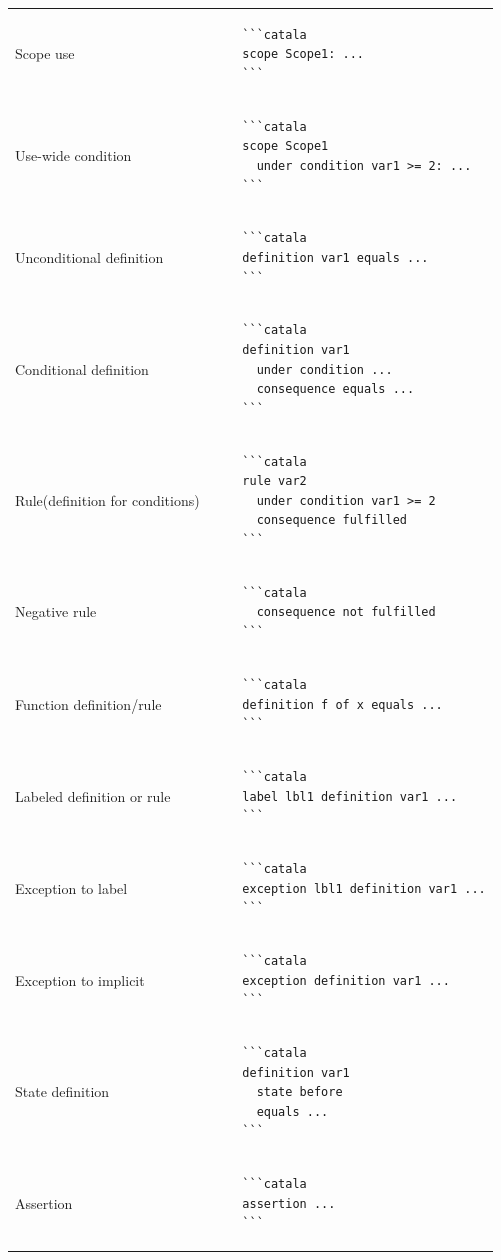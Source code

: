 \documentclass{article}
\makeatletter
\newenvironment{catala}{%
  \VerbatimEnvironment
  \let\FV@ListVSpace\relax
  \begin{verbatim}}%
 {\end{verbatim}}
\makeatother
\begin{document}
\begin{multicols}{3}
\begin{tabular}{@{}p{\cola}p{\colb}@{}}
  Scope use & \begin{catala}
    ```catala
    scope Scope1: ...
    ```
  \end{catala}
  \\
  Use-wide condition & \begin{catala}
    ```catala
    scope Scope1
      under condition var1 >= 2: ...
    ```
  \end{catala}
  \\
  Unconditional definition & \begin{catala}
    ```catala
    definition var1 equals ...
    ```
  \end{catala}
  \\
  Conditional definition & \begin{catala}
    ```catala
    definition var1
      under condition ...
      consequence equals ...
    ```
  \end{catala}
  \\
  Rule\newline(definition for conditions) & \begin{catala}
    ```catala
    rule var2
      under condition var1 >= 2
      consequence fulfilled
    ```
  \end{catala}
  \\
  Negative rule & \begin{catala}
    ```catala
      consequence not fulfilled
    ```
  \end{catala}
  \\
  Function definition/rule & \begin{catala}
    ```catala
    definition f of x equals ...
    ```
  \end{catala}
  \\
  Labeled definition or rule & \begin{catala}
    ```catala
    label lbl1 definition var1 ...
    ```
  \end{catala}
  \\
  Exception to label & \begin{catala}
    ```catala
    exception lbl1 definition var1 ...
    ```
  \end{catala}
  \\
  Exception to implicit & \begin{catala}
    ```catala
    exception definition var1 ...
    ```
  \end{catala}
  \\
  State definition & \begin{catala}
    ```catala
    definition var1
      state before
      equals ...
    ```
  \end{catala}
  \\
  Assertion & \begin{catala}
    ```catala
    assertion ...
    ```
  \end{catala}
  \\
\end{tabular}


\end{multicols}
\end{document}
